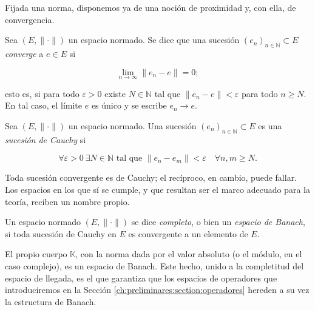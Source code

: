 Fijada una norma, disponemos ya de una noción de proximidad y, con ella, de
convergencia.\\

\begin{Definicion}
\label{ch:preliminares:def:convergencia}

Sea $(E, \lVert \cdot \rVert)$ un espacio normado. Se dice que una sucesión
$(e_n)_{n \in \mathbb{N}} \subset E$ \textit{converge} a $e \in E$ si

\[\lim_{n \rightarrow \infty} \lVert e_n - e \rVert = 0;\]

esto es, si para todo $\varepsilon > 0$ existe $N \in \mathbb{N}$ tal que
$\lVert e_n - e \rVert < \varepsilon$ para todo $n \geq N$. En tal caso, el
límite $e$ es único y se escribe $e_n \rightarrow e$.
\end{Definicion}

\begin{Definicion}
\label{ch:preliminares:def:cauchy}

Sea $(E, \lVert \cdot \rVert)$ un espacio normado. Una sucesión
$(e_n)_{n \in \mathbb{N}} \subset E$ es una \textit{sucesión de Cauchy} si

\[\forall \varepsilon > 0 \ \exists N \in \mathbb{N} \text{ tal que } \lVert e_n - e_m \rVert < \varepsilon \quad \forall n, m \geq N.\]
\end{Definicion}

Toda sucesión convergente es de Cauchy; el recíproco, en cambio, puede fallar. Los
espacios en los que sí se cumple, y que resultan ser el marco adecuado para la
teoría, reciben un nombre propio.\\

\begin{Definicion}
\label{ch:preliminares:def:banach}

Un espacio normado $(E, \lVert \cdot \rVert)$ se dice \textit{completo}, o bien un
\textit{espacio de Banach}, si toda sucesión de Cauchy en $E$ es convergente a un
elemento de $E$.
\end{Definicion}

\begin{Observacion}
\label{ch:preliminares:obs:KesBanach}
El propio cuerpo $\mathbb{K}$, con la norma dada por el valor absoluto (o el
módulo, en el caso complejo), es un espacio de Banach. Este hecho, unido a la
completitud del espacio de llegada, es el que garantiza que los espacios de
operadores que introduciremos en la Sección
\ref{ch:preliminares:section:operadores} hereden a su vez la estructura de
Banach.
\end{Observacion}

